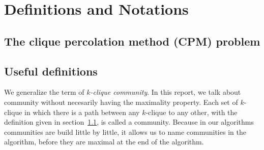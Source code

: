\section{Definitions and Notations}
\label{sec:preliminaries}

\subsection{The clique percolation method (CPM) problem}
\label{subsec:defcpm}



\subsection{Useful definitions}

We generalize the term of \emph{$k$-clique community}. In this report, we talk about community without necesarily having the maximality property. Each set of $k$-clique in which there is a path between any $k$-clique to any other, with the definition given in section~\ref{subsec:defcpm}, is called a community. Because in our algorithms communities are build little by little, it allows us to name communities in the algorithm, before they are maximal at the end of the algorithm.




